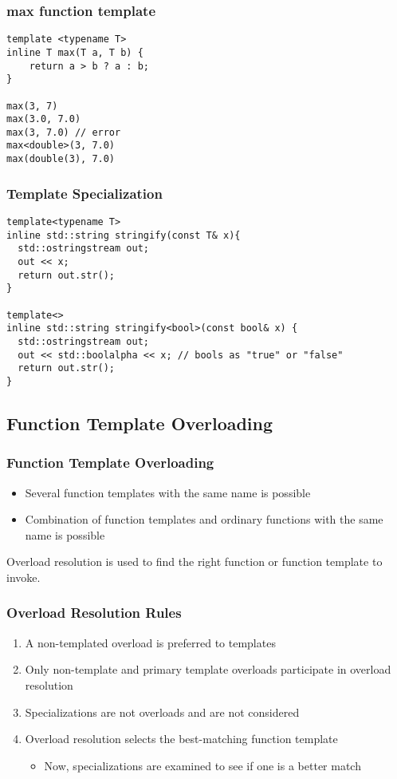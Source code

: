 \documentclass{beamer}
\begin{document}
\begin{frame}[fragile]
\frametitle{max function template}

\begin{lstlisting}
template <typename T>
inline T max(T a, T b) {
    return a > b ? a : b;
}

max(3, 7)
max(3.0, 7.0)
max(3, 7.0) // error
max<double>(3, 7.0)
max(double(3), 7.0)
\end{lstlisting}

\end{frame}

\begin{frame}[fragile]
\frametitle{Template Specialization}
\begin{lstlisting}
template<typename T> 
inline std::string stringify(const T& x){
  std::ostringstream out;
  out << x;
  return out.str();
}

template<>
inline std::string stringify<bool>(const bool& x) {
  std::ostringstream out;
  out << std::boolalpha << x; // bools as "true" or "false"
  return out.str();
}
\end{lstlisting}
\end{frame}


\subsection{Function Template Overloading}
\begin{frame}
\frametitle{Function Template Overloading}

\begin{itemize}
\item Several function templates with the same name is possible
\item Combination of function templates and ordinary functions with the same name is possible
\end{itemize}

Overload resolution is used to find the right function or function template to invoke.

\end{frame}

\begin{frame}[fragile]
\frametitle{Overload Resolution Rules}

\begin{enumerate}
\item A non-templated overload is preferred to templates
\item Only non-template and primary template overloads participate in overload resolution
\item Specializations are not overloads and are not considered
\item Overload resolution selects the best-matching function template
    \begin{itemize}
        \item Now, specializations are examined to see if one is a better match
    \end{itemize}
\end{enumerate}
\end{frame}
\end{document}
